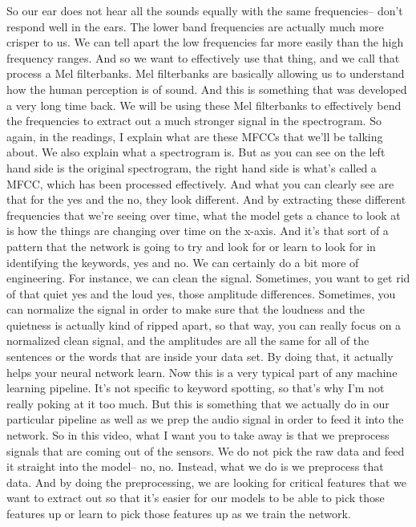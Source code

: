 So our ear does not hear all the sounds equally
with the same frequencies-- don't respond well in the ears.
The lower band frequencies are actually much more crisper to us.
We can tell apart the low frequencies far more easily
than the high frequency ranges.
And so we want to effectively use that thing,
and we call that process a Mel filterbanks.
Mel filterbanks are basically allowing us to understand
how the human perception is of sound.
And this is something that was developed a very long time back.
We will be using these Mel filterbanks to effectively bend
the frequencies to extract out a much stronger signal in the spectrogram.
So again, in the readings, I explain what are these MFCCs
that we'll be talking about.
We also explain what a spectrogram is.
But as you can see on the left hand side is the original spectrogram,
the right hand side is what's called a MFCC, which
has been processed effectively.
And what you can clearly see are that for the yes and the no,
they look different.
And by extracting these different frequencies
that we're seeing over time, what the model gets a chance to look at
is how the things are changing over time on the x-axis.
And it's that sort of a pattern that the network
is going to try and look for or learn to look for in identifying
the keywords, yes and no.
We can certainly do a bit more of engineering.
For instance, we can clean the signal.
Sometimes, you want to get rid of that quiet yes and the loud yes,
those amplitude differences.
Sometimes, you can normalize the signal in order
to make sure that the loudness and the quietness
is actually kind of ripped apart, so that way, you can really
focus on a normalized clean signal, and the amplitudes are all
the same for all of the sentences or the words that are inside your data set.
By doing that, it actually helps your neural network learn.
Now this is a very typical part of any machine learning pipeline.
It's not specific to keyword spotting, so that's
why I'm not really poking at it too much.
But this is something that we actually do in our particular pipeline
as well as we prep the audio signal in order to feed it into the network.
So in this video, what I want you to take away
is that we preprocess signals that are coming out of the sensors.
We do not pick the raw data and feed it straight into the model--
no, no.
Instead, what we do is we preprocess that data.
And by doing the preprocessing, we are looking for critical features
that we want to extract out so that it's easier for our models
to be able to pick those features up or learn to pick those features up
as we train the network.
